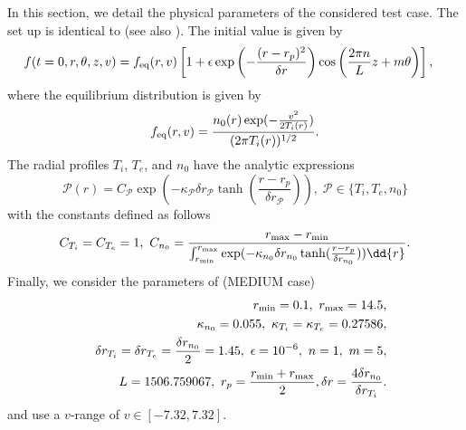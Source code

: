 In this section, we detail the physical parameters of the considered test case. The set up is identical to \cite{Crouseilles:2018} (see also \cite{Coulette:2013, Crouseilles:2014}). The initial value is given by 
\begin{align*}
  f(t=0,r,\theta,z,v) &=
  f_{\rm eq}(r,v)\left[1+\epsilon \exp\left(-\frac{(r-r_p)^2}{\delta r}\right)\cos\left(\frac{2\pi n}{L}z+m\theta\right)\right],
\end{align*}
where the equilibrium distribution is given by
\begin{equation} \label{eq:equilibrium}
  f_{\rm eq}(r,v)=\frac{n_0(r)\exp(-\frac{v^2}{2T_i(r)})}{(2\pi T_i(r))^{1/2}}.
\end{equation}
The radial profiles $T_i$, $T_e$, and $n_0$ have the analytic expressions
$$
  \mathcal{P}(r) = C_\mathcal{P}\exp\left(-\kappa_\mathcal{P}\delta r_{\mathcal{P}}\tanh(\frac{r-r_p}{\delta r_{\mathcal{P}}})\right), \; \mathcal{P}\in \{T_i,T_e,n_0\}
$$
with the constants defined as follows
$$
  C_{T_i}=C_{T_e}=1,\ C_{n_0}=\frac{r_{\rm max}-r_{\rm min}}{
\int_{r_{\rm min}}^{r_{\rm max}}\exp(-\kappa_{n_0}\delta r_{n_0}\tanh(\frac{r-r_p}{\delta r_{n_0}}))\dd{r}}.
$$
Finally, we consider the parameters of \cite{Coulette:2013} (MEDIUM case)
\begin{eqnarray*}
  &&r_{\rm min} = 0.1,\ r_{\rm max} = 14.5,\\
  && \kappa_{n_0}= 0.055,\ \kappa_{T_i}=\kappa_{T_e}= 0.27586,\\
  &&\delta r_{T_i}=\delta r_{T_e}=\frac{\delta r_{n_0}}{2}= 1.45,\ \epsilon=10^{-6},\ n=1,\ m=5,\\
  &&L=1506.759067,\ r_p = \frac{r_{\rm min}+r_{\rm max}}{2},\delta r = \frac{4 \delta r_{n_0}}{\delta r_{T_i}}.
\end{eqnarray*}
and use a $v$-range of $v \in [-7.32,7.32]$.

